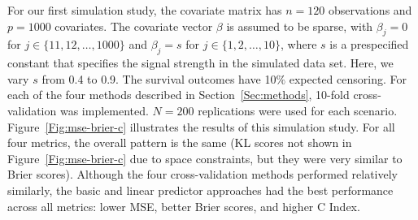 For our first simulation study, the covariate matrix has $n = 120$ observations and $p = 1000$ covariates. The covariate vector $\beta$ is assumed to be sparse, with $\beta_j = 0$ for $j \in \{11, 12, \ldots, 1000\}$ and $\beta_j = s$ for $j \in \{1, 2, \ldots, 10 \}$, where $s$ is a prespecified constant that specifies the signal strength in the simulated data set. Here, we vary $s$ from 0.4 to 0.9. The survival outcomes have 10$\%$ expected censoring. For each of the four methods described in Section~\ref{Sec:methods}, 10-fold cross-validation was implemented. $N = 200$ replications were used for each scenario.  Figure~\ref{Fig:mse-brier-c} illustrates the results of this simulation study. For all four metrics, the overall pattern is the same (KL scores not shown in Figure~\ref{Fig:mse-brier-c} due to space constraints, but they were very similar to Brier scores).  Although the four cross-validation methods performed relatively similarly, the basic and linear predictor approaches had the best performance across all metrics: lower MSE, better Brier scores, and higher C Index.

